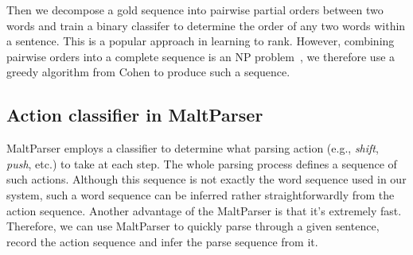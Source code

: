 Then we decompose a gold sequence into pairwise partial orders between
two words and train a binary classifer to determine the order of any two
words within a sentence. This is a popular approach in learning to rank.
However, combining pairwise orders into a complete sequence is an NP 
problem~\cite{grotschel1984cutting}, we therefore use a greedy algorithm 
from Cohen \cite{schapire1998learning} to produce such a sequence.

\subsection{Action classifier in MaltParser}
MaltParser employs a classifier to determine what parsing action (e.g.,
{\em shift}, {\em push}, etc.) to take at each step. The whole parsing
process defines a sequence of such actions. Although this sequence is
not exactly the word sequence used in our system, such a word sequence
can be inferred rather straightforwardly from the action sequence. 
Another advantage of
the MaltParser is that it's extremely fast. Therefore, we can use MaltParser
to quickly parse through a given sentence, record the action sequence and
infer the parse sequence from it. 

%


%

